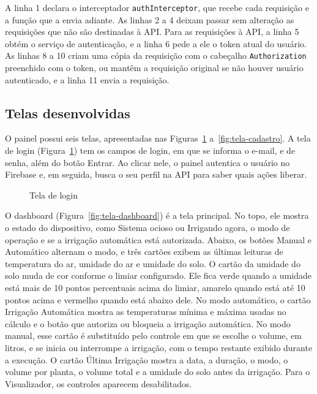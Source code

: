 A linha 1 declara o interceptador \texttt{authInterceptor}, que recebe cada requisição e a função que a envia adiante. As linhas 2 a 4 deixam passar sem alteração as requisições que não são destinadas à API. Para as requisições à API, a linha 5 obtém o serviço de autenticação, e a linha 6 pede a ele o token atual do usuário. As linhas 8 a 10 criam uma cópia da requisição com o cabeçalho \texttt{Authorization} preenchido com o token, ou mantêm a requisição original se não houver usuário autenticado, e a linha 11 envia a requisição.

\subsection{Telas desenvolvidas}

O painel possui seis telas, apresentadas nas Figuras~\ref{fig:tela-login} a~\ref{fig:tela-cadastro}. A tela de login (Figura~\ref{fig:tela-login}) tem os campos de login, em que se informa o e-mail, e de senha, além do botão Entrar. Ao clicar nele, o painel autentica o usuário no Firebase e, em seguida, busca o seu perfil na API para saber quais ações liberar.

\begin{figure}[!htbp]
  \centering
  \caption{Tela de login}
  \label{fig:tela-login}
\end{figure}

O dashboard (Figura~\ref{fig:tela-dashboard}) é a tela principal. No topo, ele mostra o estado do dispositivo, como Sistema ocioso ou Irrigando agora, o modo de operação e se a irrigação automática está autorizada. Abaixo, os botões Manual e Automático alternam o modo, e três cartões exibem as últimas leituras de temperatura do ar, umidade do ar e umidade do solo. O cartão da umidade do solo muda de cor conforme o limiar configurado. Ele fica verde quando a umidade está mais de 10 pontos percentuais acima do limiar, amarelo quando está até 10 pontos acima e vermelho quando está abaixo dele. No modo automático, o cartão Irrigação Automática mostra as temperaturas mínima e máxima usadas no cálculo e o botão que autoriza ou bloqueia a irrigação automática. No modo manual, esse cartão é substituído pelo controle em que se escolhe o volume, em litros, e se inicia ou interrompe a irrigação, com o tempo restante exibido durante a execução. O cartão Última Irrigação mostra a data, a duração, o modo, o volume por planta, o volume total e a umidade do solo antes da irrigação. Para o Visualizador, os controles aparecem desabilitados.

